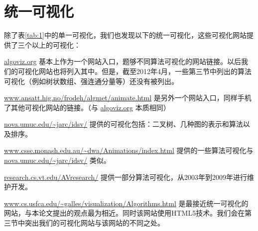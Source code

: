 \section{统一可视化}
\begin{sectext}
除了表\ref{tab:1}中的单一可视化，我们也发现以下的统一可视化，这些可视化网站提供了三个以上的可视化：
\begin{itemlist}
\item  \url{algoviz.org} 基本上作为一个网站入口，题够不同算法可视化的网站链接。以后我们的可视化网站也将列入其中。但是，截至2012年4月，一些第三节中列出的算法可视化（例如树状数组、强连通分量等）还没有被列出。

\item  \url{www.ansatt.hig.no/frodeh/algmet/animate.html} 是另外一个网站入口，同样手机了其他可视化网站的链接。（与 \url{algoviz.org} 本质相同）

\item  \url{nova.umuc.edu/~jarc/idsv/} 提供的可视化包括：二叉树、几种图的表示和算法以及排序。

\item  \url{www.csse.monash.edu.au/~dwa/Animations/index.html} 提供的一些算法可视化与 \url{nova.umuc.edu/~jarc/idsv/} 类似。

\item  \url{research.cs.vt.edu/AVresearch/} 提供一部分算法可视化，从2003年到2009年进行维护开发。

\item  \url{www.cs.usfca.edu/~galles/visualization/Algorithms.html} 是最接近统一可视化的网站，与本论文提出的观点最为相近。同时该网站使用HTML5技术。我们会在第三节中突出我们的可视化网站与该网站的不同之处。
\end{itemlist}
\end{sectext}
